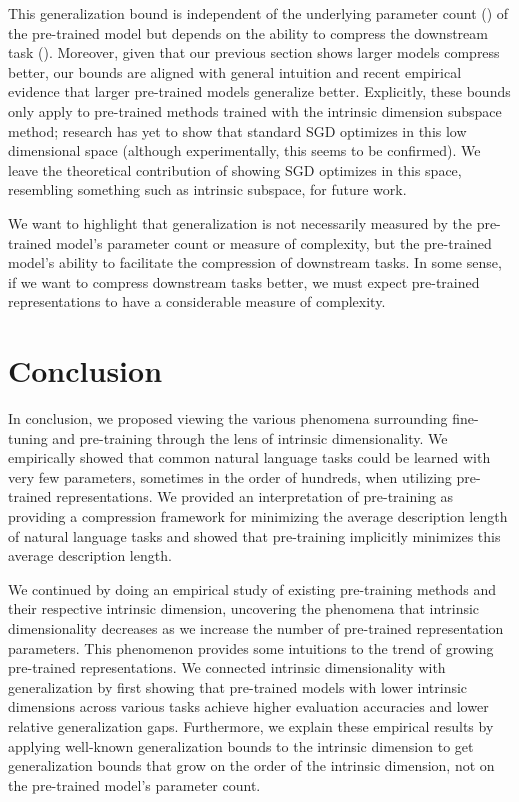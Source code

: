 \documentclass{article} \usepackage{iclr2020_conference,times}
\begin{document}
This generalization bound is independent of the underlying parameter count () of the pre-trained model but depends on the ability to compress the downstream task (). Moreover, given that our previous section shows larger models compress better, our bounds are aligned with general intuition and recent empirical evidence that larger pre-trained models generalize better. Explicitly, these bounds only apply to pre-trained methods trained with the intrinsic dimension subspace method; research has yet to show that standard SGD optimizes in this low dimensional space (although experimentally, this seems to be confirmed). We leave the theoretical contribution of showing SGD optimizes in this space, resembling something such as intrinsic subspace, for future work.

We want to highlight that generalization is not necessarily measured by the pre-trained model's parameter count or measure of complexity, but the pre-trained model's ability to facilitate the compression of downstream tasks. In some sense, if we want to compress downstream tasks better, we must expect pre-trained representations to have a considerable measure of complexity.

\section{Conclusion}
In conclusion, we proposed viewing the various phenomena surrounding fine-tuning and pre-training through the lens of intrinsic dimensionality. We empirically showed that common natural language tasks could be learned with very few parameters, sometimes in the order of hundreds, when utilizing pre-trained representations.  We provided an interpretation of pre-training as providing a compression framework for minimizing the average description length of natural language tasks and showed that pre-training implicitly minimizes this average description length.

We continued by doing an empirical study of existing pre-training methods and their respective intrinsic dimension, uncovering the phenomena that intrinsic dimensionality decreases as we increase the number of pre-trained representation parameters. This phenomenon provides some intuitions to the trend of growing pre-trained representations. We connected intrinsic dimensionality with generalization by first showing that pre-trained models with lower intrinsic dimensions across various tasks achieve higher evaluation accuracies and lower relative generalization gaps. Furthermore, we explain these empirical results by applying well-known generalization bounds to the intrinsic dimension to get generalization bounds that grow on the order of the intrinsic dimension, not on the pre-trained model's parameter count.
\end{document}
